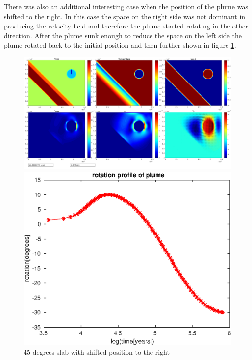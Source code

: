 \documentclass[12pt]{scrreprt}
\begin{document}
There was also an additional interesting case when the position of the plume was shifted to the right. In this case the space on the right side was not dominant in producing the velocity field and therefore the plume started rotating in the other direction. After the plume sunk enough to reduce the space on the left side the plume rotated back to the initial position and then further shown in figure \ref{fig:introtprof}.

\begin{figure}[ht!]
\begin{minipage}[t]{1.0\textwidth}
		\begin{minipage}[t]{0.5\textwidth}
		\includegraphics[width=1.0\textwidth]{./Snapshots/pos2/Subductionzonewithblob1pos2slab45s2e7s2e7r20.jpg}
		\end{minipage}
		\begin{minipage}[t]{0.5\textwidth}
		\includegraphics[width=1.0\textwidth]{./Snapshots/pos2/Subductionzonewithblobpos2slab45s2e7s2e7r20rotation.eps}
		\end{minipage}
	\end{minipage}
	\caption{45 degrees slab with shifted position to the right}
	\label{fig:introtprof}
\end{figure}
\end{document}
